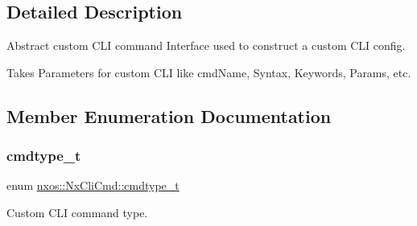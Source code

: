 \subsection{Detailed Description}
Abstract custom C\+LI command Interface used to construct a custom C\+LI config. 

Takes Parameters for custom C\+LI like cmd\+Name, Syntax, Keywords, Params, etc. 

\subsection{Member Enumeration Documentation}
\mbox{\label{classnxos_1_1_nx_cli_cmd_a82ed104f13c7859b24d3c0527f706be1}} 
\subsubsection{\texorpdfstring{cmdtype\+\_\+t}{cmdtype\_t}}
{\footnotesize\ttfamily enum \mbox{\hyperlink{classnxos_1_1_nx_cli_cmd_a82ed104f13c7859b24d3c0527f706be1}{nxos\+::\+Nx\+Cli\+Cmd\+::cmdtype\+\_\+t}}}



Custom C\+LI command type. 

